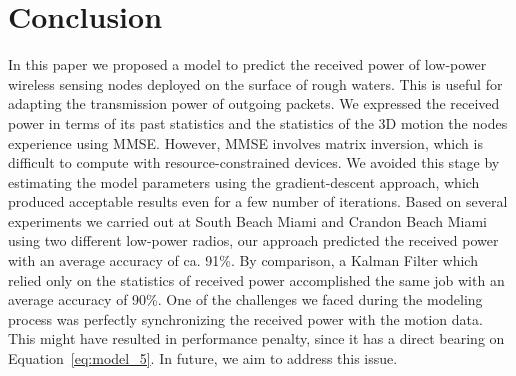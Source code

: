 \section{Conclusion} %
\label{sec:conclusion}

In this paper we proposed a model to predict the received power of low-power wireless sensing nodes deployed on the surface of rough waters. This is useful for adapting the transmission power of outgoing packets. We expressed the received power in terms of its past statistics and the statistics of the 3D motion the nodes experience using MMSE. However, MMSE involves matrix inversion, which is difficult to compute with resource-constrained devices. We avoided this stage by estimating the model parameters using the gradient-descent approach, which produced acceptable results even for a few number of iterations. Based on several experiments we carried out at South Beach Miami and Crandon Beach Miami using two different low-power radios, our approach predicted the received power with an average accuracy of ca. 91\%. By comparison, a Kalman Filter which relied only on the statistics of received power accomplished the same job with an average accuracy of 90\%. One of the challenges we faced during the modeling process was perfectly synchronizing the received power with the motion data. This might have resulted in performance penalty, since it has a direct bearing on Equation~\ref{eq:model_5}. In future, we aim to address this issue.

